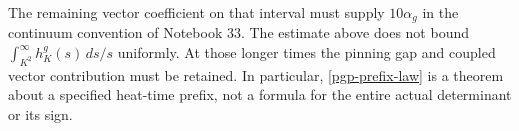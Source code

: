 The remaining vector coefficient on that interval
must supply \(10\alpha_g\) in the continuum convention
of Notebook 33. The estimate above does not bound
\(\int_{K^2}^\infty h_K^g(s)\,ds/s\) uniformly.
At those longer times the pinning gap and coupled
vector contribution must be retained. In particular,
\eqref{pgp-prefix-law} is a theorem about a specified
heat-time prefix, not a formula for the entire actual
determinant or its sign.
